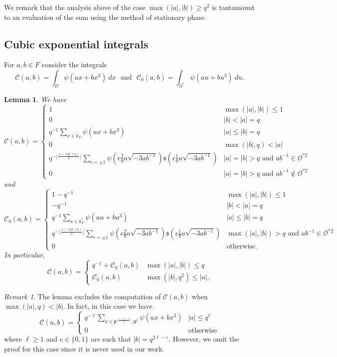 \documentclass[12pt]{amsart}
\newcommand{\abs}[1]{\left|{#1}\right|}
\newcommand{\p}{\mathfrak{p}}
\renewcommand{\O}{\mathcal{O}}
\newcommand{\sq}{\mathfrak{s}}
\newcommand{\val}{{\operatorname{val}}}
\newcommand{\Cu}{\mathcal{C}}
\newtheorem{lemma}[theorem]{Lemma}
\theoremstyle{remark}
\newtheorem{remark}[theorem]{Remark}%
\begin{document}
We remark that the analysis above of the case $\max(\abs{a},\abs{b})\ge q^2$ is tantamount to an evaluation of the sum using the method of stationary phase.

\subsection{Cubic exponential integrals}
For $a,b\in F$ consider the integrals
\[
\Cu(a,b)=\int_\O \psi(ax+bx^3)\ dx \ \ \ \text{and}\ \ \ \Cu_0(a,b)=\int_{\O^*} \psi(au+bu^3)\ du.
\]
\begin{lemma}\label{lem cobic exp}
We have
\[
\Cu(a,b)=\begin{cases} 
1 & \max(\abs{a},\abs{b}) \le 1 \\ 
0 & \abs{b}<\abs{a}=q \\
q^{-1}\sum_{x\in k_F} \psi(ax+bx^3) &  \abs{a}\le \abs{b}=q \\
 0 &\max(\abs{b},q)<\abs{a} \\
q^{-\lfloor\frac{1-\val(a)}2\rfloor}\sum_{\epsilon=\pm 1} \psi(\epsilon \frac29 a\sqrt{-3ab^{-1}})\sq(\epsilon \frac19 a\sqrt{-3ab^{-1}}) & \abs{a}=\abs{b}>q \text{ and }ab^{-1}\in \O^{*2} \\ 
0 & \abs{a}=\abs{b}>q\text{ and }ab^{-1}\not\in \O^{*2}\end{cases}
\]
and 
\[
\Cu_0(a,b)=\begin{cases} 1-q^{-1} & \max(\abs{a},\abs{b}) \le 1 \\ 
-q^{-1} & \abs{b}<\abs{a}=q\\
q^{-1}\sum_{u\in k_F^*} \psi(au+bu^3) &  \abs{a}\le \abs{b}=q 
\\ q^{-\lfloor\frac{1-\val(a)}2\rfloor} \sum_{\epsilon=\pm 1} \psi(\epsilon \frac29 a\sqrt{-3ab^{-1}})\sq(\epsilon \frac19 a\sqrt{-3ab^{-1}}) & \max(\abs{a},\abs{b})>q \text{ and }ab^{-1}\in \O^{*2} \\ 0 & \text{otherwise.}\end{cases}
\]
In particular, 
\[
\Cu(a,b)=\begin{cases}
q^{-1}+\Cu_0(a,b) & \max(\abs{a},\abs{b})\le q \\
\Cu_0(a,b) & \max(\abs{b},q^2)\le \abs{a}.
\end{cases}
\]
\end{lemma}
\begin{remark}
The lemma excludes the computation of $\Cu(a,b)$ when $\max(\abs{a},q)<\abs{b}$. In fact, in this case we have
\[
\Cu(a,b)=\begin{cases} 
q^{-\ell}\sum_{x\in \p^{\lfloor \frac{\ell+1-e}2\rfloor}/\p^\ell} \psi(ax+bx^3) & \abs{a}\le q^\ell \\
0 & \text{otherwise}
\end{cases}
\] 
where $\ell\ge 1$ and $e\in\{0,1\}$ are such that $\abs{b}=q^{2\ell-e}$.
However, we omit the proof for this case since it is never used in our work. 
\end{remark}
\end{document}

